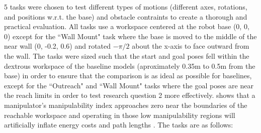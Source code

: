 \documentclass[defaultstyle,11pt]{thesis}
\begin{document}
5 tasks were chosen to test different types of motions (different axes, rotations, and positions w.r.t. the base) and obstacle contraints to create a thorough and practical evaluation. 
All tasks use a workspace centered at the robot base (0, 0, 0) except for the ``Wall Mount" task where the base is moved to the middle of the near wall (0, -0.2, 0.6) and rotated $-\pi/2$ about the x-axis to face outward from the wall.
The tasks were sized such that the start and goal poses fell within the dextrous workspace of the baseline models (aproximately 0.35m to 0.5m from the base) in order to ensure that the comparison is as ideal as possible for baselines, except for the ``Outreach" and ``Wall Mount" tasks where the goal poses are near the reach limits in order to test research question 2 more effectively.
\cite{yoshikawa1985manipulability} shows that a manipulator's manipulability index approaches zero near the boundaries of the reachable workspace and operating in those low manipulability regions will artificially inflate energy costs and path lengths \cite{vahrenkamp2012manipulability}.
The tasks are as follows:
\end{document}
